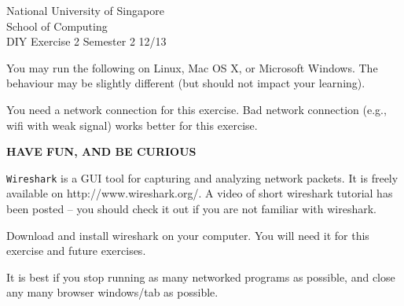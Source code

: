 \documentclass[a4paper,11pt]{exam}
\begin{document}
\extraheadheight{.5in}
%
{\large\sf National University of Singapore\\ School of Computing \\
\LARGE\sf DIY Exercise 2}%
{\large\sf Semester 2 12/13}
\firstpageheadrule
\pagestyle{headandfoot}

You may run the following on Linux, Mac OS X, or Microsoft Windows.  The behaviour may be slightly different (but should not impact your learning).

You need a network connection for this exercise.  Bad network connection (e.g., wifi with weak signal) works better for this exercise.

\begin{center}
	\textbf\textsf{HAVE FUN, AND BE CURIOUS}
\end{center}


\texttt{Wireshark} is a GUI tool for capturing and analyzing network packets.  It is freely available on http://www.wireshark.org/.  A video of short wireshark tutorial has been posted -- you should check it out if you are not familiar with wireshark.

Download and install wireshark on your computer.  You will need it for this exercise and future exercises.

It is best if you stop running as many networked programs as possible, and close any many browser windows/tab as possible.
\end{document}
